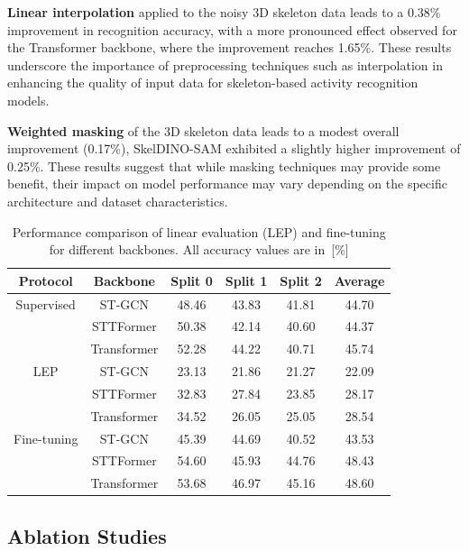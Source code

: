 \textbf{Linear interpolation} applied to the noisy 3D skeleton data leads to a 0.38\% improvement in recognition accuracy, with a more pronounced effect observed for the Transformer backbone, where the improvement reaches 1.65\%. These results underscore the importance of preprocessing techniques such as interpolation in enhancing the quality of input data for skeleton-based activity recognition models.

\textbf{Weighted masking} of the 3D skeleton data leads to a modest overall improvement (0.17\%), SkelDINO-SAM exhibited a slightly higher improvement of 0.25\%. These results suggest that while masking techniques may provide some benefit, their impact on model performance may vary depending on the specific architecture and dataset characteristics.

\begin{table}[t]
\centering
\caption{Performance comparison of linear evaluation (LEP) and fine-tuning for different backbones. All accuracy values are in~[\%]}
\label{tab:LEP-FT}
\begin{tabular}{c c c c c c}
\hline
Protocol & Backbone & Split 0 & Split 1 & Split 2 & Average \\
\hline
Supervised & ST-GCN & 48.46 & 43.83 & 41.81 & 44.70 \\
 & STTFormer & 50.38 & 42.14 & 40.60 & 44.37 \\
 & Transformer & 52.28 & 44.22 & 40.71 & 45.74 \\
\hline
LEP & ST-GCN & 23.13 & 21.86 & 21.27 & 22.09 \\
 & STTFormer & 32.83 & 27.84 & 23.85 & 28.17 \\
 & Transformer & 34.52 & 26.05 & 25.05 & 28.54 \\
\hline
Fine-tuning & ST-GCN & 45.39 & 44.69 & 40.52 & 43.53 \\
 & STTFormer & 54.60 & 45.93 & 44.76 & 48.43 \\
 & Transformer & 53.68 & 46.97 & 45.16 & 48.60 \\
\hline
\end{tabular}
\end{table}

\subsection{Ablation Studies}

